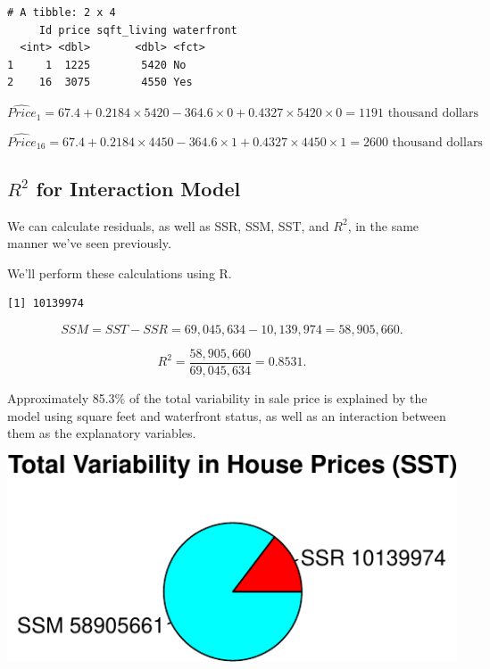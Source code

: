 \documentclass[
  letterpaper,
  DIV=11,
  numbers=noendperiod]{scrreprt}
\newenvironment{Shaded}{\begin{snugshade}}{\end{snugshade}}
\newcommand{\DecValTok}[1]{\textcolor[rgb]{0.68,0.00,0.00}{#1}}
\newcommand{\FunctionTok}[1]{\textcolor[rgb]{0.28,0.35,0.67}{#1}}
\newcommand{\NormalTok}[1]{\textcolor[rgb]{0.00,0.23,0.31}{#1}}
\newcommand{\OtherTok}[1]{\textcolor[rgb]{0.00,0.23,0.31}{#1}}
\newcommand{\SpecialCharTok}[1]{\textcolor[rgb]{0.37,0.37,0.37}{#1}}
\begin{document}
\begin{verbatim}
# A tibble: 2 x 4
     Id price sqft_living waterfront
  <int> <dbl>       <dbl> <fct>     
1     1  1225        5420 No        
2    16  3075        4550 Yes       
\end{verbatim}

\[
\widehat{Price}_1 = 67.4 + 0.2184\times5420  -364.6\times0 + 0.4327\times5420 \times 0 = 1191 \text{ thousand dollars}
\]

\[
\widehat{Price}_{16} = 67.4 + 0.2184\times4450  -364.6\times1 + 0.4327\times4450 \times 1 = 2600 \text{ thousand dollars}
\]

\subsection{\texorpdfstring{\(R^2\) for Interaction
Model}{R\^{}2 for Interaction Model}}\label{r2-for-interaction-model}

We can calculate residuals, as well as SSR, SSM, SST, and \(R^2\), in
the same manner we've seen previously.

We'll perform these calculations using R.

\begin{Shaded}
\end{Shaded}

\begin{verbatim}
[1] 10139974
\end{verbatim}

\[
SSM = SST-SSR = 69,045,634 - 10,139,974 =58,905,660.
\]

\[
R^2 = \frac{58,905,660}{69,045,634}=0.8531.
\]

Approximately 85.3\% of the total variability in sale price is explained
by the model using square feet and waterfront status, as well as an
interaction between them as the explanatory variables.

\includegraphics{Ch2_files/figure-pdf/unnamed-chunk-49-1.pdf}
\end{document}
